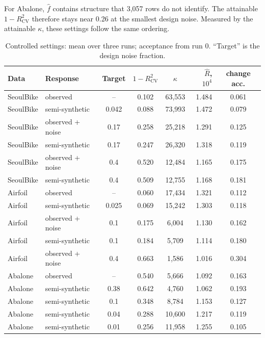 \documentclass[11pt]{article}
\newcommand{\Rhat}{\hat R}
\begin{document}
For Abalone, $\hat f$ contains structure that 3,057 rows do not identify. The attainable $1-R^2_{\mathrm{CV}}$ therefore stays near 0.26 at the smallest design noise. Measured by the attainable $\kappa$, these settings follow the same ordering.

\begin{table}[h]
\centering
\caption{Controlled settings: mean over three runs; acceptance from run 0. ``Target'' is the design noise fraction.}
\label{tab:controlled}
\begin{tabular}{llcccrc}
\toprule
Data & Response & Target & $1-R^2_{\mathrm{CV}}$ & $\kappa$ & $\Rhat$, $10^4$ & change acc. \\
\midrule
SeoulBike & observed & -- & 0.102 & 63{,}553 & 1.484 & 0.061 \\
SeoulBike & semi-synthetic & 0.042 & 0.088 & 73{,}993 & 1.472 & 0.079 \\
SeoulBike & observed + noise & 0.17 & 0.258 & 25{,}218 & 1.291 & 0.125 \\
SeoulBike & semi-synthetic & 0.17 & 0.247 & 26{,}320 & 1.318 & 0.119 \\
SeoulBike & observed + noise & 0.4 & 0.520 & 12{,}484 & 1.165 & 0.175 \\
SeoulBike & semi-synthetic & 0.4 & 0.509 & 12{,}755 & 1.168 & 0.181 \\
\midrule
Airfoil & observed & -- & 0.060 & 17{,}434 & 1.321 & 0.112 \\
Airfoil & semi-synthetic & 0.025 & 0.069 & 15{,}242 & 1.303 & 0.118 \\
Airfoil & observed + noise & 0.1 & 0.175 & 6{,}004 & 1.130 & 0.162 \\
Airfoil & semi-synthetic & 0.1 & 0.184 & 5{,}709 & 1.114 & 0.180 \\
Airfoil & observed + noise & 0.4 & 0.663 & 1{,}586 & 1.016 & 0.304 \\
\midrule
Abalone & observed & -- & 0.540 & 5{,}666 & 1.092 & 0.163 \\
Abalone & semi-synthetic & 0.38 & 0.642 & 4{,}760 & 1.062 & 0.193 \\
Abalone & semi-synthetic & 0.1 & 0.348 & 8{,}784 & 1.153 & 0.127 \\
Abalone & semi-synthetic & 0.04 & 0.288 & 10{,}600 & 1.217 & 0.119 \\
Abalone & semi-synthetic & 0.01 & 0.256 & 11{,}958 & 1.255 & 0.105 \\
\bottomrule
\end{tabular}
\end{table}
\end{document}
